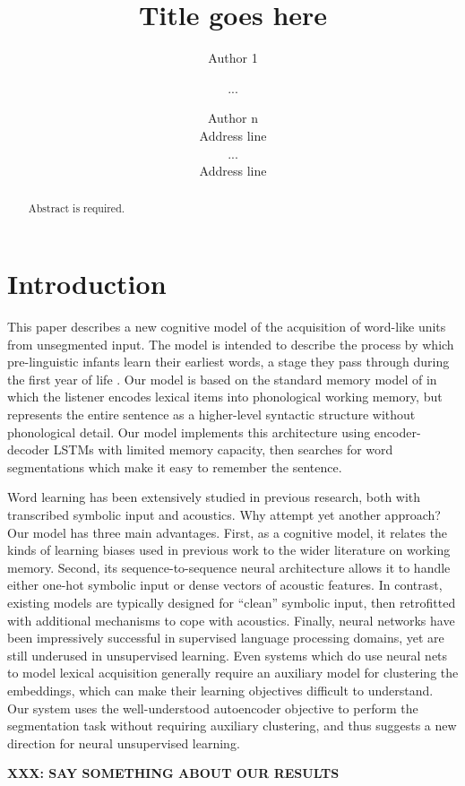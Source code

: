 \documentclass[11pt,letterpaper]{article}
\title{Title goes here}
\author{Author 1 \and ... \and Author n \\
        Address line \\ ... \\ Address line}
\date{}
\newcommand{\xxx}[1]{\textbf{\color{red}XXX: #1}}
\begin{document}
\maketitle

\begin{abstract}
Abstract is required.
\end{abstract}


\section{Introduction}

This paper describes a new cognitive model of the acquisition of
word-like units from unsegmented input. The model is intended to
describe the process by which pre-linguistic infants learn their
earliest words, a stage they pass through during the first year of
life \cite{Jusczyk}. Our model is based on the standard memory model
of  in which the listener encodes lexical items into
phonological working memory, but represents the entire sentence as a
higher-level syntactic structure without phonological detail. Our
model implements this architecture using encoder-decoder LSTMs with
limited memory capacity, then searches for word segmentations which
make it easy to remember the sentence.

Word learning has been extensively studied in previous research, both
with transcribed symbolic input and acoustics. Why attempt yet another
approach? Our model has three main advantages. First, as a cognitive
model, it relates the kinds of learning biases used in previous work
to the wider literature on working memory. Second, its
sequence-to-sequence neural architecture allows it to handle either
one-hot symbolic input or dense vectors of acoustic features. In
contrast, existing models are typically designed for ``clean''
symbolic input, then retrofitted with additional mechanisms to cope
with acoustics. Finally, neural networks have been impressively
successful in supervised language processing domains, yet are still
underused in unsupervised learning. Even systems which do use neural
nets to model lexical acquisition generally require an auxiliary model
for clustering the embeddings, which can make their learning
objectives difficult to understand. Our system uses the
well-understood autoencoder objective to perform the segmentation task
without requiring auxiliary clustering, and thus suggests a new
direction for neural unsupervised learning.

\xxx{SAY SOMETHING ABOUT OUR RESULTS}
\end{document}
